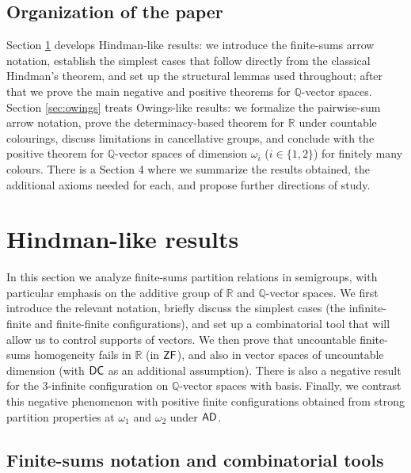 \documentclass[10pt,a4paper]{amsart}
\theoremstyle{definition}
\newcommand{\zf}{\mathnormal{\mathsf{ZF}}}
\newcommand{\dc}{\mathnormal{\mathsf{DC}}}
\newcommand{\ad}{\mathnormal{\mathsf{AD}}}
\theoremstyle{remark}
\numberwithin{equation}{section}
\begin{document}
\subsection*{Organization of the paper}\label{sec:paper-organization}
Section \ref{sec:hindman} develops Hindman-like results: we introduce the finite-sums arrow notation, establish the simplest cases that follow directly from the classical Hindman's theorem, and set up the structural lemmas used throughout; after that we prove the main negative and positive theorems for $\mathbb{Q}$-vector spaces. Section \ref{sec:owings} treats Owings-like results: we formalize the pairwise-sum arrow notation, prove the determinacy-based theorem for $\mathbb{R}$ under countable colourings, discuss limitations in cancellative groups, and conclude with the positive theorem for $\mathbb{Q}$-vector spaces of dimension $\omega_i$ ($i\in\{1,2\}$) for finitely many colours. There is a Section 4 where we summarize the results obtained, the additional axioms needed for each, and propose further directions of study.



\section{Hindman-like results}\label{sec:hindman}

In this section we analyze finite-sums partition relations in semigroups, with particular emphasis on the additive group of $\mathbb R$ and $\mathbb{Q}$-vector spaces. 
We first introduce the relevant notation, briefly discuss the simplest cases (the infinite-finite and finite-finite configurations), and set up a combinatorial tool that will allow us to control supports of vectors. 
We then prove that uncountable finite-sums homogeneity fails in $\mathbb R$ (in $\zf$), and also in vector spaces of uncountable dimension (with $\dc$ as an additional assumption). There is also a negative result for the $3$-infinite configuration on $\mathbb Q$-vector spaces with basis. Finally, we contrast this negative phenomenon with positive finite configurations obtained from strong partition properties at $\omega_1$ and $\omega_2$ under $\ad$.


\subsection{Finite-sums notation and combinatorial tools}\label{subsec:hindman-tools}
\end{document}
